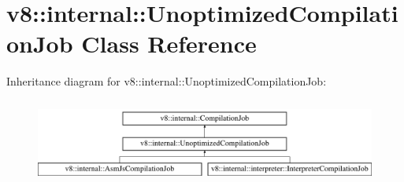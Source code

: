 \hypertarget{classv8_1_1internal_1_1UnoptimizedCompilationJob}{}\section{v8\+:\+:internal\+:\+:Unoptimized\+Compilation\+Job Class Reference}
\label{classv8_1_1internal_1_1UnoptimizedCompilationJob}
Inheritance diagram for v8\+:\+:internal\+:\+:Unoptimized\+Compilation\+Job\+:\begin{figure}[H]
\begin{center}
\leavevmode
\includegraphics[height=2.818792cm]{classv8_1_1internal_1_1UnoptimizedCompilationJob}
\end{center}
\end{figure}
